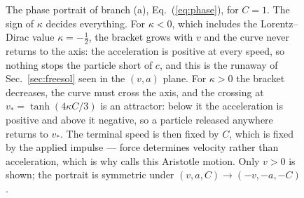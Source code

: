 \begin{figure}[htb]
\caption{The phase portrait of branch (a), Eq.~(\ref{eq:phase}), for $C=1$. The sign of $\kappa$ decides everything. For $\kappa<0$,
which includes the Lorentz--Dirac value $\kappa=-\tfrac12$, the bracket grows
with $v$ and the curve never returns to the axis: the acceleration is positive
at every speed, so nothing stops the particle short of $c$, and this is the
runaway of Sec.~\ref{sec:freesol} seen in the $(v,a)$ plane. For $\kappa>0$ the
bracket decreases, the curve must cross the axis, and the crossing at
$v_*=\tanh(4\kappa C/3)$ is an attractor: below it the acceleration is positive
and above it negative, so a particle released anywhere returns to $v_*$. The
terminal speed is then fixed by $C$, which is fixed by the applied impulse ---
force determines velocity rather than acceleration, which is why
\citet{zhang2006} calls this Aristotle motion. Only $v>0$ is shown; the
portrait is symmetric under $(v,a,C)\to(-v,-a,-C)$.
\label{fig:phase}}
\end{figure}
